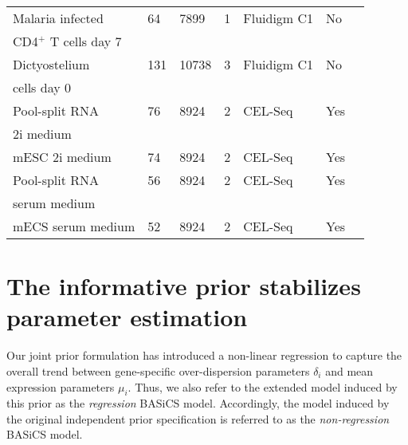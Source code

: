 \begin{table}[hb	]
\begin{tabular}{lllllll}
Malaria infected  & 64       & 7899     & 1          & Fluidigm C1       & No   & \citep{Lonnberg2017}         \\
CD4$^+$  T cells day 7    &   & &  &  &  &   \\
\midrule

Dictyostelium             & 131      & 10738    & 3          & Fluidigm C1       & No   & \citep{Antolovic2017}        \\
cells day 0  &  &   &   &  & & \\
\midrule

Pool-split RNA                 & 76       & 8924     & 2          & CEL-Seq           & Yes  & \citep{Grun2014}            \\
2i medium  &  &  & &  &  & \\
\midrule

mESC 2i medium    & 74       & 8924     & 2          & CEL-Seq           & Yes  & \citep{Grun2014} \\
\midrule

Pool-split RNA             & 56       & 8924     & 2          & CEL-Seq           & Yes  & \citep{Grun2014}            \\
serum medium &  &      &         &   &   &  \\
\midrule

mECS serum medium & 52       & 8924     & 2          & CEL-Seq           & Yes  & \citep{Grun2014} \\
\bottomrule       
\end{tabular}
\end{table}


\section{The informative prior stabilizes parameter estimation}
\label{sec2:stabilization}

Our joint prior formulation has introduced a non-linear regression to capture the overall trend between gene-specific over-dispersion parameters $\delta_i$ and mean expression parameters $\mu_i$. Thus, we also refer to the extended model induced by this prior as the \textit{regression} BASiCS model. Accordingly, the model induced by the original independent prior specification \citep{Vallejos2016} is referred to as the \textit{non-regression} BASiCS model.\\ 


